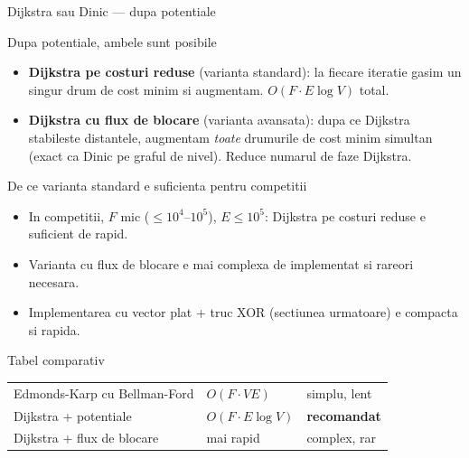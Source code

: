 ﻿\documentclass[9pt]{beamer}
\begin{document}
\begin{frame}[shrink]{Dijkstra sau Dinic --- dupa potentiale}
  \begin{block}{Dupa potentiale, ambele sunt posibile}
    \begin{footnotesize}
    \begin{itemize}\itemsep0pt
      \item \textbf{Dijkstra pe costuri reduse} (varianta standard): la fiecare iteratie gasim
            un singur drum de cost minim si augmentam. $O(F\cdot E\log V)$ total.
      \item \textbf{Dijkstra cu flux de blocare} (varianta avansata): dupa ce Dijkstra
            stabileste distantele, augmentam \textit{toate} drumurile de cost minim simultan
            (exact ca Dinic pe graful de nivel). Reduce numarul de faze Dijkstra.
    \end{itemize}
    \end{footnotesize}
  \end{block}
  \vspace{-6pt}
  \begin{alertblock}{De ce varianta standard e suficienta pentru competitii}
    \begin{footnotesize}
    \begin{itemize}\itemsep0pt
      \item In competitii, $F$ mic ($\leq 10^4$--$10^5$), $E\leq 10^5$:
            Dijkstra pe costuri reduse e suficient de rapid.
      \item Varianta cu flux de blocare e mai complexa de implementat si rareori necesara.
      \item Implementarea cu vector plat + truc XOR (sectiunea urmatoare) e compacta si rapida.
    \end{itemize}
    \end{footnotesize}
  \end{alertblock}
  \vspace{-6pt}
  \begin{block}{Tabel comparativ}
    \footnotesize
    \begin{tabular}{llp{2.8cm}}
    Edmonds-Karp cu Bellman-Ford & $O(F\!\cdot\! VE)$ & simplu, lent\\
    Dijkstra + potentiale & $O(F\!\cdot\! E\log V)$ & \textbf{recomandat}\\
    Dijkstra + flux de blocare & mai rapid & complex, rar\\
    \end{tabular}
  \end{block}
\end{frame}
\end{document}

